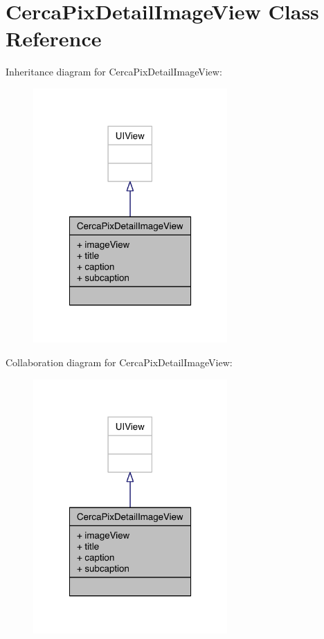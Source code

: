 \hypertarget{interface_cerca_pix_detail_image_view}{\section{Cerca\-Pix\-Detail\-Image\-View Class Reference}
\label{interface_cerca_pix_detail_image_view}
}


Inheritance diagram for Cerca\-Pix\-Detail\-Image\-View\-:\nopagebreak
\begin{figure}[H]
\begin{center}
\leavevmode
\includegraphics[width=210pt]{interface_cerca_pix_detail_image_view__inherit__graph}
\end{center}
\end{figure}


Collaboration diagram for Cerca\-Pix\-Detail\-Image\-View\-:\nopagebreak
\begin{figure}[H]
\begin{center}
\leavevmode
\includegraphics[width=210pt]{interface_cerca_pix_detail_image_view__coll__graph}
\end{center}
\end{figure}
